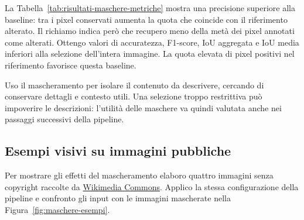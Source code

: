 La Tabella~\ref{tab:risultati-maschere-metriche} mostra una precisione superiore alla baseline: tra i pixel conservati aumenta la quota che coincide con il riferimento alterato. Il richiamo indica però che recupero meno della metà dei pixel annotati come alterati. Ottengo valori di accuratezza, F1-score, IoU aggregata e IoU media inferiori alla selezione dell'intera immagine. La quota elevata di pixel positivi nel riferimento favorisce questa baseline.

Uso il mascheramento per isolare il contenuto da descrivere, cercando di conservare dettagli e contesto utili. Una selezione troppo restrittiva può impoverire le descrizioni: l'utilità delle maschere va quindi valutata anche nei passaggi successivi della pipeline.

\newpage
\subsection{Esempi visivi su immagini pubbliche}
\label{subsec:risultati-maschere-esempi}

Per mostrare gli effetti del mascheramento elaboro quattro immagini senza copyright raccolte da \href{https://commons.wikimedia.org/wiki/Main_Page}{Wikimedia Commons}. Applico la stessa configurazione della pipeline e confronto gli input con le immagini mascherate nella Figura~\ref{fig:maschere-esempi}.

